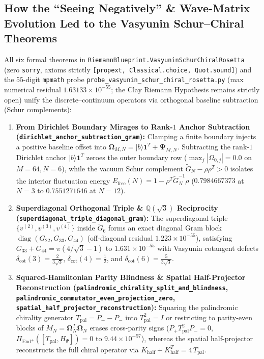 \documentclass[11pt,a4paper]{article}
\theoremstyle{definition}
\begin{document}
\subsection*{How the ``Seeing Negatively'' \& Wave-Matrix Evolution Led to the Vasyunin Schur--Chiral Theorems}
All six formal theorems in \texttt{RiemannBlueprint.VasyuninSchurChiralRosetta} (zero \texttt{sorry}, axioms strictly \texttt{[propext, Classical.choice, Quot.sound]}) and the $55$-digit \texttt{mpmath} probe \texttt{probe\_vasyunin\_schur\_chiral\_rosetta.py} (max numerical residual $1.63133\times 10^{-55}$; the Clay Riemann Hypothesis remains strictly open) unify the discrete--continuum operators via orthogonal baseline subtraction (Schur complements):
\begin{enumerate}[leftmargin=1.8em,itemsep=2pt]
\item \textbf{From Dirichlet Boundary Mirages to Rank-$1$ Anchor Subtraction (\texttt{dirichlet\_anchor\_subtraction\_gram}):} Clamping a finite boundary injects a positive baseline offset into $\mathbf{\Omega}_{M,N} = |b\rangle\mathbf{1}^T + \mathbf{\Psi}_{M,N}$. Subtracting the rank-$1$ Dirichlet anchor $|b\rangle\mathbf{1}^T$ zeroes the outer boundary row ($\max_j |\Omega_{0,j}| = 0.0$ on $M=64, N=6$), while the vacuum Schur complement $\widetilde{G}_N - \rho\rho^T > 0$ isolates the interior fluctuation energy $E_{\mathrm{free}}(N) = 1 - \rho^T \widetilde{G}_N^{-1}\rho$ ($0.7984667373$ at $N=3$ to $0.7551271646$ at $N=12$).
\item \textbf{Superdiagonal Orthogonal Triple \& $\mathbb{Q}(\sqrt{3})$ Reciprocity (\texttt{superdiagonal\_triple\_diagonal\_gram}):} The superdiagonal triple $\{v^{(2)}, v^{(3)}, v^{(4)}\}$ inside $\widetilde{G}_6$ forms an exact diagonal Gram block $\operatorname{diag}(G_{22}, G_{33}, G_{44})$ (off-diagonal residual $1.223\times 10^{-55}$), satisfying $G_{33} + G_{44} = \pi(4/\sqrt{3} - 1)$ to $1.631\times 10^{-55}$ with Vasyunin cotangent defects $\delta_{\cot}(3) = \tfrac{2}{3\sqrt{3}}$, $\delta_{\cot}(4) = \tfrac{1}{2}$, and $\delta_{\cot}(6) = \tfrac{5}{3\sqrt{3}}$.
\item \textbf{Squared-Hamiltonian Parity Blindness \& Spatial Half-Projector Reconstruction (\texttt{palindromic\_chirality\_split\_and\_blindness}, \texttt{palindromic\_commutator\_even\_projection\_zero}, \texttt{spatial\_half\_projector\_reconstruction}):} Squaring the palindromic chirality generator $T_{\mathrm{pal}} = P_+ - P_-$ into $T_{\mathrm{pal}}^2 = I$ or restricting to parity-even blocks of $M_N = \mathbf{\Omega}_N^T \mathbf{\Omega}_N$ erases cross-parity signs ($P_+ T_{\mathrm{pal}}^2 P_- = 0$, $\Pi_{\mathrm{End}^+}([T_{\mathrm{pal}}, H_\Psi]) = 0$ to $9.44\times 10^{-57}$), whereas the spatial half-projector reconstructs the full chiral operator via $K_{\mathrm{half}} + K_{\mathrm{half}}^T = 4\,T_{\mathrm{pal}}$.

\end{enumerate}
\end{document}
